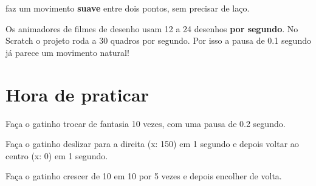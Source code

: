  faz um movimento \textbf{suave} entre dois pontos, sem precisar de laço.

\begin{curiosidade}
Os animadores de filmes de desenho usam 12 a 24 desenhos \textbf{por segundo}. No Scratch o projeto roda a 30 quadros por segundo. Por isso a pausa de 0.1 segundo já parece um movimento natural!
\end{curiosidade}

\section{Hora de praticar}

\begin{exercicio}
Faça o gatinho trocar de fantasia 10 vezes, com uma pausa de 0.2 segundo.
\end{exercicio}

\begin{solucao}
\begin{pilha}
\sbcend
\end{pilha}
\end{solucao}

\begin{exercicio}
Faça o gatinho deslizar para a direita (x: 150) em 1 segundo e depois voltar ao centro (x: 0) em 1 segundo.
\end{exercicio}

\begin{solucao}
\begin{pilha}
\end{pilha}
\end{solucao}

\begin{exercicio}
Faça o gatinho crescer de 10 em 10 por 5 vezes e depois encolher de volta.
\end{exercicio}

\begin{solucao}
\begin{pilha}
\sbcend
{}
\sbcend
\end{pilha}
\end{solucao}


